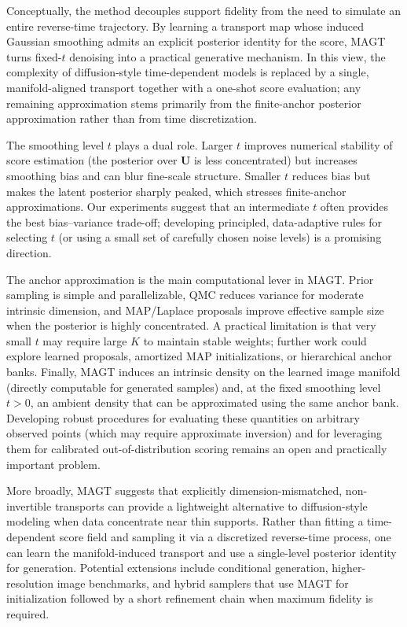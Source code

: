 \documentclass[12pt]{article}
\theoremstyle{definition} %
\newcommand{\U}{\bm U}
\providecommand{\method}{MAGT} %
\begin{document}
Conceptually, the method decouples support fidelity from the need to simulate an entire reverse-time trajectory.
By learning a transport map whose induced Gaussian smoothing admits an explicit posterior identity for the score, \method{} turns fixed-$t$ denoising into a practical generative mechanism.
In this view, the complexity of diffusion-style time-dependent models is replaced by a single, manifold-aligned transport together with a one-shot score evaluation; any remaining approximation stems primarily from the finite-anchor posterior approximation rather than from time discretization.

The smoothing level $t$ plays a dual role.
Larger $t$ improves numerical stability of score estimation (the posterior over $\U$ is less concentrated) but increases smoothing bias and can blur fine-scale structure.
Smaller $t$ reduces bias but makes the latent posterior sharply peaked, which stresses finite-anchor approximations.
Our experiments suggest that an intermediate $t$ often provides the best bias--variance trade-off; developing principled, data-adaptive rules for selecting $t$ (or using a small set of carefully chosen noise levels) is a promising direction.

The anchor approximation is the main computational lever in \method{}.
Prior sampling is simple and parallelizable, QMC reduces variance for moderate intrinsic dimension, and MAP/Laplace proposals improve effective sample size when the posterior is highly concentrated. A practical limitation is that very small $t$ may require large $K$ to maintain stable weights; further work could explore learned proposals, amortized MAP initializations, or hierarchical anchor banks.
Finally, \method{} induces an intrinsic density on the learned image manifold (directly computable for generated samples) and, at the fixed smoothing level $t>0$, an ambient density that can be approximated using the same anchor bank. Developing robust procedures for evaluating these quantities on arbitrary observed points (which may require approximate inversion) and for leveraging them for calibrated out-of-distribution scoring remains an open and practically important problem.

More broadly, \method{} suggests that explicitly dimension-mismatched, non-invertible transports can provide a lightweight alternative to diffusion-style modeling when data concentrate near thin supports.
Rather than fitting a time-dependent score field and sampling it via a discretized reverse-time process, one can learn the manifold-induced transport and use a single-level posterior identity for generation.
Potential extensions include conditional generation, higher-resolution image benchmarks, and hybrid samplers that use \method{} for initialization followed by a short refinement chain when maximum fidelity is required.
\newpage
\end{document}
